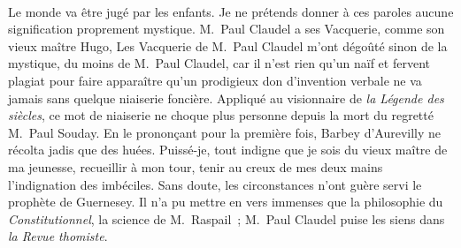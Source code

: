 \documentclass[french,twoside]{book} %
\newcommand{\astertri}{\medskip\par\centerline{\color{rubric}\large\selectfont{\syms ✻\,✻\,✻}}\medskip\par}%
\begin{document}
\noindent  \par
Le monde va être jugé par les enfants. Je ne prétends donner à ces paroles aucune signification proprement mystique. M. Paul Claudel a ses Vacquerie, comme son vieux maître Hugo, Les Vacquerie de M. Paul Claudel m’ont dégoûté sinon de la mystique, du moins de M. Paul Claudel, car il n’est rien qu’un naïf et fervent plagiat pour faire apparaître qu’un prodigieux don d’invention verbale ne va jamais sans quelque niaiserie foncière. Appliqué au visionnaire de \emph{la Légende des siècles}, ce mot de niaiserie ne choque plus personne depuis la mort du regretté M. Paul Souday. En le prononçant pour la première fois, Barbey d’Aurevilly ne récolta jadis que des huées. Puissé-je, tout indigne que je sois du vieux maître de ma jeunesse, recueillir à mon tour, tenir au creux de mes deux mains l’indignation des imbéciles. Sans doute, les circonstances n’ont guère servi le prophète de Guernesey. Il n’a pu mettre en vers immenses que la philosophie du \emph{Constitutionnel}, la science de M. Raspail ; M. Paul Claudel puise les siens dans \emph{la Revue thomiste}.\par
 \par

\astertri
\end{document}
